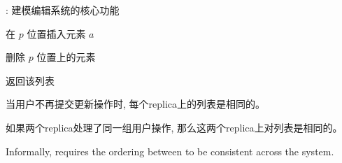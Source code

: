 \begin{frame}{}
  \centerline{\Large {}: 建模编辑系统的核心功能}
  \vspace{0.30cm}

  \begin{center}
    \begin{minipage}{0.70\textwidth}
      \begin{description}
	\setlength{\itemsep}{10pt}
	\item[$\textsc{Ins}(a, p):$] 在 $p$ 位置插入元素 $a$
	\item[$\textsc{Del}(p):$] 删除 $p$ 位置上的元素
	\item[$\textsc{Read}:$] 返回该列表
      \end{description}
    \end{minipage}
  \end{center}
\end{frame}

\begin{frame}{}
  \begin{cdef}
    当用户不再提交更新操作时, 每个replica上的列表是相同的。
  \end{cdef}

  \pause
  \vspace{0.50cm}

  \begin{cdef}
    如果两个replica处理了同一组用户操作, 那么这两个replica上对列表是相同的。
  \end{cdef}

  \pause
  \vspace{0.60cm}
  \centerline{}
\end{frame}

\begin{frame}{}

  \vspace{0.20cm}
  \begin{cdef}
    Informally, \wlspec{} requires the ordering between  to be consistent across the system.
  \end{cdef}

  \vspace{0.60cm}
  \centerline{}
\end{frame}

